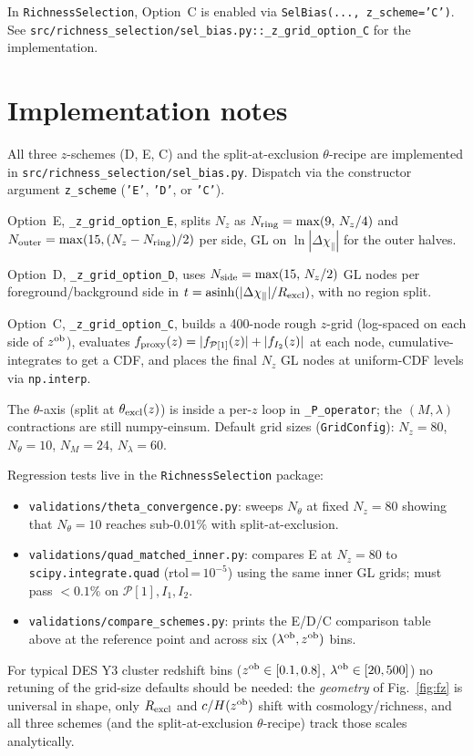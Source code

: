 \documentclass[11pt]{article}
\newcommand{\lob}{\lambda^{\rm ob}}
\newcommand{\zob}{z^{\rm ob}}
\newcommand{\Pop}{\mathcal{P}}
\begin{document}
In \texttt{RichnessSelection}, Option~C is enabled via
\texttt{SelBias(..., z\_scheme='C')}. See
\texttt{src/richness\_selection/sel\_bias.py::\_z\_grid\_option\_C}
for the implementation.

\section{Implementation notes}

All three \(z\)-schemes (D, E, C) and the split-at-exclusion
\(\theta\)-recipe are implemented in
\texttt{src/richness\_selection/sel\_bias.py}. Dispatch via the
constructor argument \texttt{z\_scheme}
(\texttt{'E'}, \texttt{'D'}, or \texttt{'C'}).

Option~E, \texttt{\_z\_grid\_option\_E}, splits
\(N_z\) as \(N_{\rm ring}=\max(9,\,N_z/4)\) and
\(N_{\rm outer}=\max(15,(N_z-N_{\rm ring})/2)\) per side, GL on
\(\ln|\Delta\chi_\parallel|\) for the outer halves.

Option~D, \texttt{\_z\_grid\_option\_D}, uses
\(N_{\rm side}=\max(15,\,N_z/2)\) GL nodes per foreground/background
side in \(t=\mathrm{asinh}(|\Delta\chi_\parallel|/R_{\rm excl})\),
with no region split.

Option~C, \texttt{\_z\_grid\_option\_C}, builds a 400-node rough
\(z\)-grid (log-spaced on each side of \(\zob\)), evaluates
\(f_{\rm proxy}(z)=|f_{\Pop[1]}(z)|+|f_{I_2}(z)|\) at each node,
cumulative-integrates to get a CDF, and places the final \(N_z\)
GL nodes at uniform-CDF levels via
\texttt{np.interp}.

The \(\theta\)-axis (split at
\(\theta_{\rm excl}(z)\)) is inside a per-\(z\) loop in
\texttt{\_P\_operator}; the \((M,\lambda)\) contractions are still
numpy-einsum. Default grid sizes
(\texttt{GridConfig}): \(N_z\!=\!80\), \(N_\theta\!=\!10\),
\(N_M\!=\!24\), \(N_\lambda\!=\!60\).

Regression tests live in the \texttt{RichnessSelection} package:
\begin{itemize}
  \item \texttt{validations/theta\_convergence.py}: sweeps
        \(N_\theta\) at fixed \(N_z\!=\!80\) showing that
        \(N_\theta\!=\!10\) reaches sub-\(0.01\%\) with
        split-at-exclusion.
  \item \texttt{validations/quad\_matched\_inner.py}: compares E
        at \(N_z\!=\!80\) to
        \texttt{scipy.integrate.quad} (rtol\,=\,\(10^{-5}\)) using
        the same inner GL grids; must pass \(<\!0.1\%\) on
        \(\Pop[1], I_1, I_2\).
  \item \texttt{validations/compare\_schemes.py}: prints the
        E/D/C comparison table above at the reference point and
        across six \((\lob,\zob)\) bins.
\end{itemize}

For typical DES Y3 cluster redshift bins
(\(\zob\in[0.1,0.8]\), \(\lob\in[20,500]\)) no retuning of the
grid-size defaults should be needed: the \emph{geometry} of
Fig.~\ref{fig:fz} is universal in shape, only \(R_{\rm excl}\) and
\(c/H(\zob)\) shift with cosmology/richness, and all three schemes
(and the split-at-exclusion \(\theta\)-recipe) track those scales
analytically.
\end{document}
